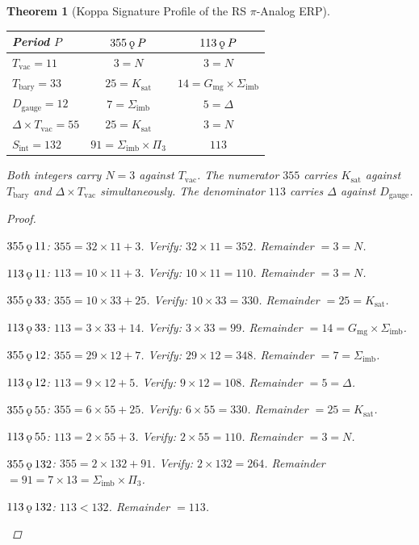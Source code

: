 \documentclass[11pt, letterpaper]{article}
\newcommand{\koppa}{\mathbin{\text{\rm\k{o}}}}
\newcommand{\Tbary}{T_{\mathrm{bary}}}
\newcommand{\Dg}{D_{\mathrm{gauge}}}
\newcommand{\Sint}{S_{\mathrm{int}}}
\newcommand{\Sigimb}{\Sigma_{\mathrm{imb}}}
\newcommand{\Gmg}{G_{\mathrm{mg}}}
\newcommand{\Ksat}{K_{\mathrm{sat}}}
\newcommand{\Tvac}{T_{\mathrm{vac}}}
\newcommand{\Pithree}{\Pi_3}
\theoremstyle{definition}
\theoremstyle{plain}
\newtheorem{theorem}{Theorem}[section]
\begin{document}
\begin{theorem}[Koppa Signature Profile of the RS $\pi$-Analog ERP]
\label{thm:pi-koppa}
\begin{rsbox}
\begin{center}
\begin{tabular}{lcc}
\toprule
Period $P$ & $355\koppa P$ & $113\koppa P$ \\
\midrule
$\Tvac=11$ & $3=N$ & $3=N$ \\
$\Tbary=33$ & $25=\Ksat$ & $14=\Gmg\times\Sigimb$ \\
$\Dg=12$ & $7=\Sigimb$ & $5=\Delta$ \\
$\Delta\times\Tvac=55$ & $25=\Ksat$ & $3=N$ \\
$\Sint=132$ & $91=\Sigimb\times\Pithree$ & $113$ \\
\bottomrule
\end{tabular}
\end{center}
Both integers carry $N=3$ against $\Tvac$.  The numerator $355$ carries
$\Ksat$ against $\Tbary$ and $\Delta\times\Tvac$ simultaneously.  The
denominator $113$ carries $\Delta$ against $\Dg$.
\end{rsbox}
\begin{proof}
\begin{rsbox}
$355\koppa11$: $355=32\times11+3$.  Verify: $32\times11=352$.
Remainder $=3=N$.

$113\koppa11$: $113=10\times11+3$.  Verify: $10\times11=110$.
Remainder $=3=N$.

$355\koppa33$: $355=10\times33+25$.  Verify: $10\times33=330$.
Remainder $=25=\Ksat$.

$113\koppa33$: $113=3\times33+14$.  Verify: $3\times33=99$.
Remainder $=14=\Gmg\times\Sigimb$.

$355\koppa12$: $355=29\times12+7$.  Verify: $29\times12=348$.
Remainder $=7=\Sigimb$.

$113\koppa12$: $113=9\times12+5$.  Verify: $9\times12=108$.
Remainder $=5=\Delta$.

$355\koppa55$: $355=6\times55+25$.  Verify: $6\times55=330$.
Remainder $=25=\Ksat$.

$113\koppa55$: $113=2\times55+3$.  Verify: $2\times55=110$.
Remainder $=3=N$.

$355\koppa132$: $355=2\times132+91$.  Verify: $2\times132=264$.
Remainder $=91=7\times13=\Sigimb\times\Pithree$.

$113\koppa132$: $113<132$.  Remainder $=113$.
\end{rsbox}
\end{proof}
\end{theorem}
\end{document}
